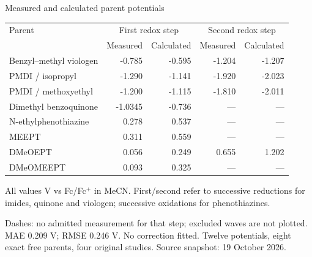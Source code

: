 \begin{frame}{Measured and calculated parent potentials}
\small\centering\renewcommand{\arraystretch}{1.1}
\begin{tabular}{@{}lrrrr@{}}\toprule
Parent & \multicolumn{2}{c}{First redox step} & \multicolumn{2}{c}{Second redox step} \\
& Measured & Calculated & Measured & Calculated \\ \midrule
Benzyl--methyl viologen & -0.785 & -0.595 & -1.204 & -1.207 \\
PMDI / isopropyl & -1.290 & -1.141 & -1.920 & -2.023 \\
PMDI / methoxyethyl & -1.200 & -1.115 & -1.810 & -2.011 \\
Dimethyl benzoquinone & -1.0345 & -0.736 & --- & --- \\
N-ethylphenothiazine & 0.278 & 0.537 & --- & --- \\
MEEPT & 0.311 & 0.559 & --- & --- \\
DMeOEPT & 0.056 & 0.249 & 0.655 & 1.202 \\
DMeOMEEPT & 0.093 & 0.325 & --- & --- \\
\bottomrule\end{tabular}
\par\medskip\raggedright\footnotesize All values V vs Fc/Fc$^+$ in MeCN. First/second refer to successive reductions for imides, quinone and viologen; successive oxidations for phenothiazines.
\par\smallskip Dashes: no admitted measurement for that step; excluded waves are not plotted. MAE 0.209 V; RMSE 0.246 V. No correction fitted.
\vfill\scriptsize Twelve potentials, eight exact free parents, four original studies. Source snapshot: 19 October 2026.
\end{frame}
